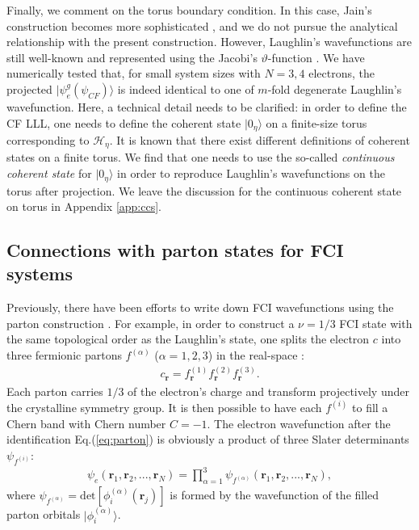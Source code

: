 Finally, we comment on the torus boundary condition. In this case, Jain's construction becomes more sophisticated \cite{pu2017composite}, and we do not pursue the analytical relationship with the present construction. However, Laughlin's wavefunctions are still well-known and represented using the Jacobi's $\vartheta$-function \cite{haldane1985periodic}. We have numerically tested that, for small system sizes with $N=3,4$ electrons, the projected $|\psi^g_e(\psi_{CF})\rangle$ is indeed identical to one of $m$-fold degenerate Laughlin's wavefunction. Here, a technical detail needs to be clarified: in order to define the CF LLL, one needs to define the coherent state $|0_{\eta}\rangle$ on a finite-size torus corresponding to $\mathcal H_{\eta}$. It is known that there exist different definitions of coherent states on a finite torus. We find that one needs to use the so-called \emph{continuous coherent state} \cite{fremling2014coherent} for $|0_{\eta}\rangle$ in order to reproduce Laughlin's wavefunctions on the torus after projection. We leave the discussion for the continuous coherent state on torus in Appendix \ref{app:ccs}.

\subsection{Connections with parton states for FCI systems}\label{sec:connection_eft}
Previously, there have been efforts to write down FCI wavefunctions using the parton construction \cite{lu2012symmetry}. For example, in order to construct a $\nu=1/3$ FCI state with the same topological order as the Laughlin's state, one splits the electron $c$ into three fermionic partons $f^{(\alpha)}$ ($\alpha=1,2,3$) in the real-space \cite{jain1989incompressible}:
\begin{align}
    c_{\bm r}=f^{(1)}_{\bm r}f^{(2)}_{\bm r} f^{(3)}_{\bm r}. \label{eq:parton}
\end{align}
Each parton carries $1/3$ of the electron's charge and transform projectively under the crystalline symmetry group. It is then possible to have each $f^{(i)}$ to fill a Chern band with Chern number $C=-1$. The electron wavefunction after the identification Eq.(\ref{eq:parton}) is obviously a product of three Slater determinants $\psi_{f^{(i)}}$:
\begin{align}
    \psi_e(\bm r_1,\bm r_2,... ,\bm r_N)=\prod_{\alpha=1}^3\psi_{f^{(\alpha)}}(\bm r_1,\bm r_2,... ,\bm r_N),\label{eq:parton_wavefunc}
\end{align}
where $\psi_{f^{(\alpha)}}=\text{det}[\phi^{(\alpha)}_i(\bm r_j)]$ is formed by the wavefunction of the filled parton orbitals $|\phi^{(\alpha)}_i\rangle$.

